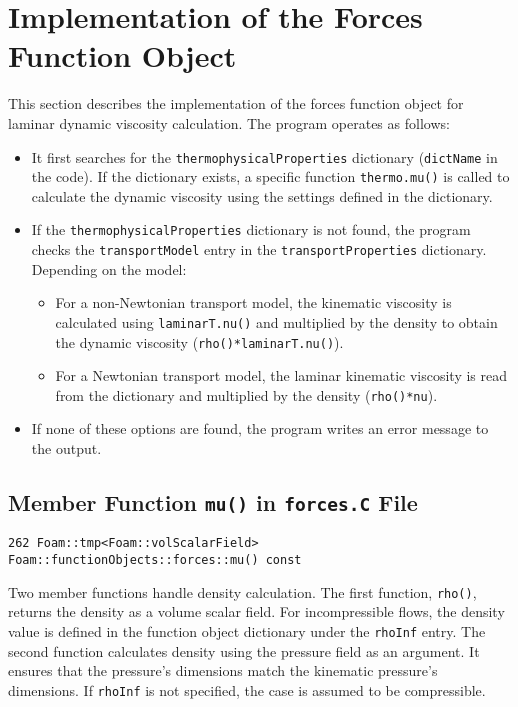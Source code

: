\section*{Implementation of the Forces Function Object}

This section describes the implementation of the forces function object for laminar dynamic viscosity calculation. The program operates as follows:

\begin{itemize}
    \item It first searches for the \texttt{thermophysicalProperties} dictionary (\texttt{dictName} in the code). If the dictionary exists, a specific function \texttt{thermo.mu()} is called to calculate the dynamic viscosity using the settings defined in the dictionary.
    \item If the \texttt{thermophysicalProperties} dictionary is not found, the program checks the \texttt{transportModel} entry in the \texttt{transportProperties} dictionary. Depending on the model:
    \begin{itemize}
        \item For a non-Newtonian transport model, the kinematic viscosity is calculated using \texttt{laminarT.nu()} and multiplied by the density to obtain the dynamic viscosity (\texttt{rho()*laminarT.nu()}).
        \item For a Newtonian transport model, the laminar kinematic viscosity is read from the dictionary and multiplied by the density (\texttt{rho()*nu}).
    \end{itemize}
    \item If none of these options are found, the program writes an error message to the output.
\end{itemize}

\subsection*{Member Function \texttt{mu()} in \texttt{forces.C} File}
\begin{lstlisting}
262 Foam::tmp<Foam::volScalarField> Foam::functionObjects::forces::mu() const
\end{lstlisting}

\noindent Two member functions handle density calculation. The first function, \texttt{rho()}, returns the density as a volume scalar field. For incompressible flows, the density value is defined in the function object dictionary under the \texttt{rhoInf} entry. The second function calculates density using the pressure field as an argument. It ensures that the pressure's dimensions match the kinematic pressure's dimensions. If \texttt{rhoInf} is not specified, the case is assumed to be compressible.

